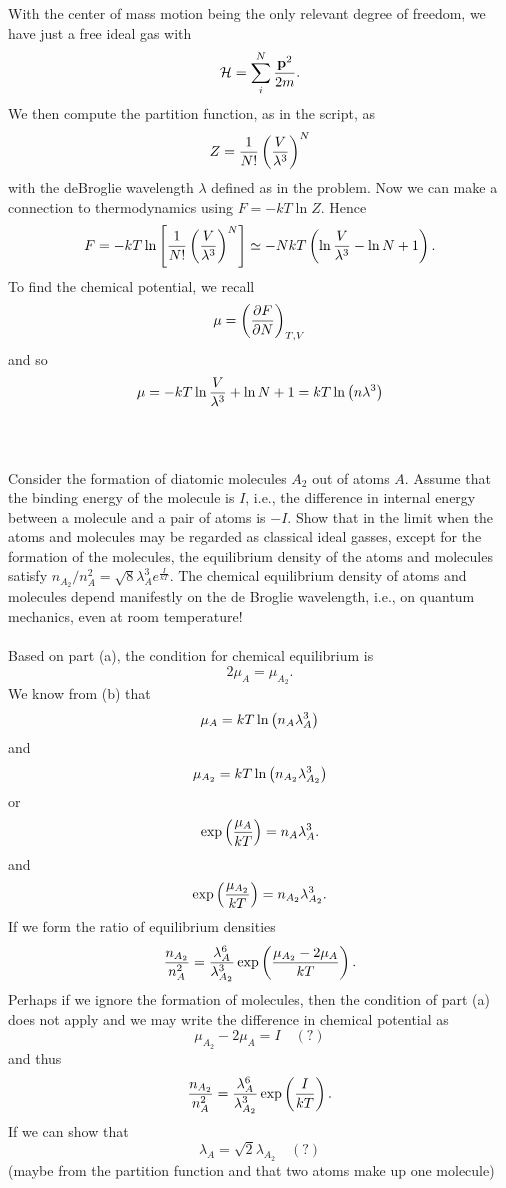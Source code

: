 \documentclass[11pt,letterpaper]{article}
\begin{document}
		With the center of mass motion being the only relevant degree of freedom, we have just a free ideal 
		gas with 
		\[
			\mathcal H = \sum_i^N \frac{\vect p^2}{2m}. 
		\]
		We then compute the partition function, as in the script, as 
		\[
			Z = \frac{1}{N!}\pfrac{V}{\lambda^3}^N
		\]
		with the deBroglie wavelength $\lambda$ defined as in the problem. Now we can make a 
		connection to thermodynamics using $F = -kT\ln Z$. Hence
		\[
			F = -kT\ln\blr{ \frac{1}{N!}\pfrac{V}{\lambda^3}^N} \simeq-NkT\plr{\ln\frac{V}{\lambda^3}
			-\ln N+1}.
		\]
		To find the chemical potential, we recall
		\[
			\mu = \plr{\pdiff[F]{N}}_{T,V}
		\]
		and so
		\[
			\mu = -kT\ln\frac{V}{\lambda^3}+\ln N+1 = kT\ln\plr{n\lambda^3}
		\]
		\\ \\
		\item
		Consider the formation of diatomic molecules $A_2$ out of atoms $A$. Assume that the binding
		energy of the molecule is $I$, i.e., the difference in internal energy between a molecule and a pair
		of atoms is $-I$. Show that in the limit when the atoms and molecules may be regarded as classical
		ideal gasses, except for the formation of the molecules, the equilibrium density of the atoms and
		molecules satisfy $n_{A_2}/n^2_{A} = \sqrt 8 \lambda_A^3 e^{\frac{I}{kT}}$. The chemical
		equilibrium density of atoms and molecules depend manifestly on the de Broglie wavelength, 
		i.e., on quantum mechanics, even at room temperature!
		\\
		\\
		Based on part (a), the condition for chemical equilibrium is
		\[
			2\mu_A = \mu_{A_2}.
		\]
		We know from (b) that
		\[
			\mu_A =  kT\ln\plr{n_A\lambda_A^3}
		\]
		and
		\[
			\mu_{A_2} =  kT\ln\plr{n_{A_2}\lambda_{A_2}^3}
		\]
		or
		\[
			\exp\plr{\frac{\mu_A}{kT}} = n_A\lambda_A^3.
		\]
		and
		\[
			\exp\plr{\frac{\mu_{A_2}}{kT}} = n_{A_2}\lambda_{A_2}^3.
		\]
		If we form the ratio of equilibrium densities
		\[
			\frac{n_{A_2}}{n^2_A} = \frac{\lambda_A^6}{\lambda_{A_2}^3}
			\exp\plr{\frac{\mu_{A_2}-2\mu_A}{kT}}.
		\]
		Perhaps if we ignore the formation of molecules, then the condition of part (a) does not 
		apply and we may write the difference in chemical potential as 
		\[
			\mu_{A_2} - 2\mu_A = I\quad (?)
		\]
		and thus
		\[
			\frac{n_{A_2}}{n^2_A} =  \frac{\lambda_A^6}{\lambda_{A_2}^3}\exp\plr{\frac{I}{kT}}.
		\]
		If we can show that
		\[
			\lambda_A =\sqrt 2 \lambda_{A_2}\quad (?)
		\]
		(maybe from the partition function and that two atoms make up one molecule)
\end{document}

